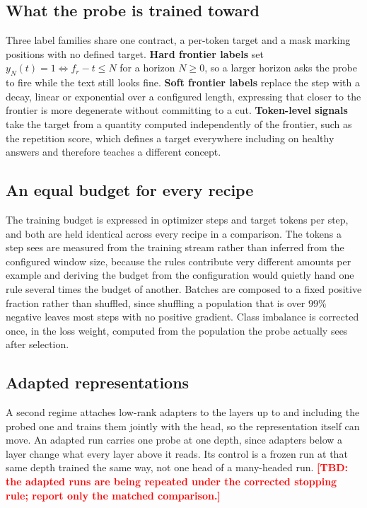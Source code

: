 \documentclass{article}
\newcommand{\TBD}[1]{\textcolor{red}{\textbf{[TBD: #1]}}}
\begin{document}
\subsection{What the probe is trained toward}
\label{sec:targets}
Three label families share one contract, a per-token target and a mask marking
positions with no defined target. \textbf{Hard frontier labels} set
$y_N(t)=1 \iff f_r - t \leq N$ for a horizon $N \geq 0$, so a larger horizon asks
the probe to fire while the text still looks fine. \textbf{Soft frontier labels}
replace the step with a decay, linear or exponential over a configured length,
expressing that closer to the frontier is more degenerate without committing to a
cut. \textbf{Token-level signals} take the target from a quantity computed
independently of the frontier, such as the repetition score, which defines a
target everywhere including on healthy answers and therefore teaches a different
concept.

\subsection{An equal budget for every recipe}
The training budget is expressed in optimizer steps and target tokens per step,
and both are held identical across every recipe in a comparison. The tokens a
step sees are measured from the training stream rather than inferred from the
configured window size, because the rules contribute very different amounts per
example and deriving the budget from the configuration would quietly hand one
rule several times the budget of another. Batches are composed to a fixed
positive fraction rather than shuffled, since shuffling a population that is over
$99\%$ negative leaves most steps with no positive gradient. Class imbalance is
corrected once, in the loss weight, computed from the population the probe
actually sees after selection.

\subsection{Adapted representations}
\label{sec:adapted}
A second regime attaches low-rank adapters \citep{hu2022lora} to the layers up to
and including the probed one and trains them jointly with the head, so the
representation itself can move. An adapted run carries one probe at one depth,
since adapters below a layer change what every layer above it reads. Its control
is a frozen run at that same depth trained the same way, not one head of a
many-headed run. \TBD{the adapted runs are being repeated under the corrected
stopping rule; report only the matched comparison.}
\end{document}
